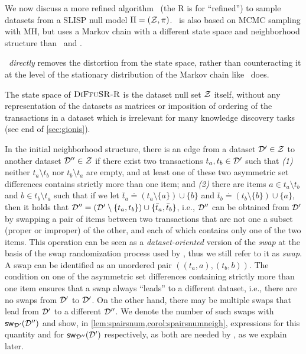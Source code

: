 We now discuss a more refined algorithm \ (the \textsc{R} is for
``refined'') to sample datasets from a SLISP null model $\Pi = (\mathcal{Z},
\pi)$. \ is also based on MCMC sampling with MH, but uses a Markov
chain with a different state space and neighborhood structure than \gioalgo\ and
\naivealgo.

\ \emph{directly} removes the distortion from the state space, rather
than counteracting it at the level of the stationary distribution of the Markov
chain like \naivealgo\ does.

The state space of $\textsc{DiFfuSR-R}$ is the dataset null set $\mathcal{Z}$ itself, without
any representation of the datasets as matrices or imposition of ordering of the
transactions in a dataset which  is irrelevant for many knowledge discovery
tasks (see end of \cref{sec:gionis}).


In the initial neighborhood structure, there is an edge from a dataset $\mathcal{D}' \in
\mathcal{Z}$ to another dataset $\mathcal{D}'' \in \mathcal{Z}$ if there exist two transactions
$t_a, t_b \in \mathcal{D}'$ such that \textit{(1)} neither $t_a \setminus t_b$ nor
$t_b \setminus t_a$ are empty, and at least one of these two asymmetric set
differences contains strictly more than one item; and \textit{(2)}
there are items $a \in t_a \setminus t_b$ and $b \in t_b \setminus
t_a$ such that if we let $\bar{t}_a \doteq (t_a \setminus \{a\}) \cup \{b\}$
and $\bar{t}_b \doteq (t_b \setminus \{b\}) \cup \{a\}$, then it holds that
$\mathcal{D}'' = ( \mathcal{D}' \setminus \{t_a, t_b\} ) \cup \{ \bar{t}_a, \bar{t}_b
\}$, i.e., $\mathcal{D}''$ can be obtained from $\mathcal{D}'$ by swapping a pair of
items between two transactions that are not one a subset (proper or improper) of
the other, and each of which contains only one of the two items. This operation
can be seen as a \emph{dataset-oriented} version of the \emph{swap} at the basis
of the swap randomization process used by \gioalgo, thus we still refer to it as
\emph{swap}. A swap can be identified as an unordered pair $((t_a,a), (t_b,b))$.
The condition on one of the asymmetric set differences containing strictly more
than one item ensures that a swap always ``leads'' to a different dataset, i.e.,
there are no swaps from $\mathcal{D}'$ to $\mathcal{D}'$. On the other hand, there may
be multiple swaps that lead from $\mathcal{D}'$ to a different $\mathcal{D}''$. We
denote the number of such swaps with $\mathsf{sw}_{\mathcal{D}'}\lparen\mathcal{D}''\rparen$ and
show, in \cref{lem:spairsnum,corol:spairsnumneigh}, expressions for this
quantity and for $\mathsf{sw}_{\mathcal{D}''}\lparen\mathcal{D}'\rparen$ respectively, as both are
needed by , as we explain later.

